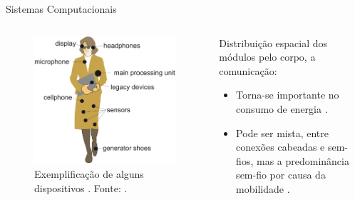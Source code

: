       \begin{frame}{Sistemas Computacionais \Wearables} \vspace{-1em}
         \begin{columns}
            \begin{column}{0.6\textwidth}
               \begin{figure}[h] \centering
                  \includegraphics[width=1\textwidth]{img/into-wearable2.png}
                  \caption{Exemplificação de alguns dispositivos \wearables. Fonte: \cite{Plessl2003}.}
                  \label{fig:into-wearable}
               \end{figure}
            \end{column}
            \begin{column}{0.4\textwidth}
               Distribuição espacial dos módulos pelo corpo, a comunicação:
               \begin{itemize}
                  \setlength{\itemsep}{1.5em}
                  \item Torna-se importante no consumo de energia \cite{Kymissis1998}.
                  \item Pode ser mista, entre conexões cabeadas e sem-fios, mas a predominância sem-fio por causa da mobilidade \cite{Plessl2003}.
               \end{itemize}
               
            \end{column}
         \end{columns}
         
      \end{frame}
   
